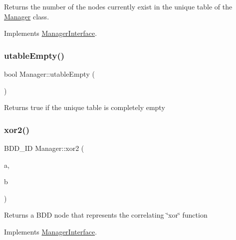\begin{DoxyReturn}{Returns}
the number of the nodes currently exist in the unique table of the \hyperlink{classManager}{Manager} class. 
\end{DoxyReturn}


Implements \hyperlink{classManagerInterface_a88f79dbba9be5dc2a4e0fb21ac627c98}{Manager\+Interface}.

\mbox{\label{classManager_afc3f9c453c3afb8024d811edfeb0e7e5}} 
\subsubsection{\texorpdfstring{utable\+Empty()}{utableEmpty()}}
{\footnotesize\ttfamily bool Manager\+::utable\+Empty (\begin{DoxyParamCaption}{ }\end{DoxyParamCaption})}

\begin{DoxyReturn}{Returns}
true if the unique table is completely empty 
\end{DoxyReturn}
\mbox{\label{classManager_a2582e9a9474189a2710c551548c20c19}} 
\subsubsection{\texorpdfstring{xor2()}{xor2()}}
{\footnotesize\ttfamily B\+D\+D\+\_\+\+ID Manager\+::xor2 (\begin{DoxyParamCaption}\item[{const B\+D\+D\+\_\+\+ID}]{a,  }\item[{const B\+D\+D\+\_\+\+ID}]{b }\end{DoxyParamCaption})\hspace{0.3cm}{\ttfamily [virtual]}}

\begin{DoxyReturn}{Returns}
a B\+DD node that represents the correlating \char`\"{}xor\char`\"{} function 
\end{DoxyReturn}


Implements \hyperlink{classManagerInterface_a47d905e239650c255330b841edabd59d}{Manager\+Interface}.

